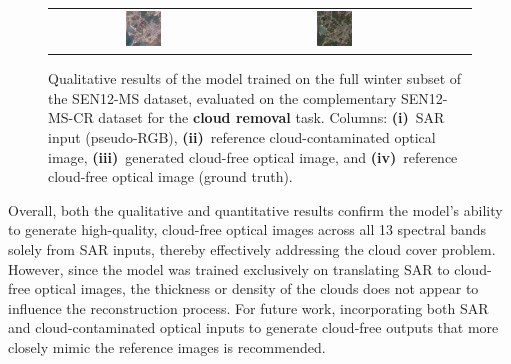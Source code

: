 \begin{figure}[h!]
\begin{tabular}{c *{4}{c}}
        \includegraphics[width=0.2\textwidth, height=0.2\textheight, keepaspectratio]{img/cloud_removal/sample_000150_pred_rgb.png} &
        \includegraphics[width=0.2\textwidth, height=0.2\textheight, keepaspectratio]{img/cloud_removal/sample_000150_true_rgb.png} \\
    \end{tabular}

    \caption[Qualitative results on cloud removal]{%
    Qualitative results of the model trained on the full winter subset of the SEN12-MS dataset, evaluated on the complementary SEN12-MS-CR dataset for the \textbf{cloud removal} task.  
    Columns: 
    \textbf{(i)}~SAR input (pseudo-RGB), 
    \textbf{(ii)}~reference cloud-contaminated optical image, 
    \textbf{(iii)}~generated cloud-free optical image, and 
    \textbf{(iv)}~reference cloud-free optical image (ground truth).}
    \label{fig:qualitative_results_cloud_removal}
\end{figure}

Overall, both the qualitative and quantitative results confirm the model’s ability to generate high-quality, cloud-free optical images across all 13 spectral bands solely from SAR inputs, thereby effectively addressing the cloud cover problem. However, since the model was trained exclusively on translating SAR to cloud-free optical images, the thickness or density of the clouds does not appear to influence the reconstruction process. For future work, incorporating both SAR and cloud-contaminated optical inputs to generate cloud-free outputs that more closely mimic the reference images is recommended.
